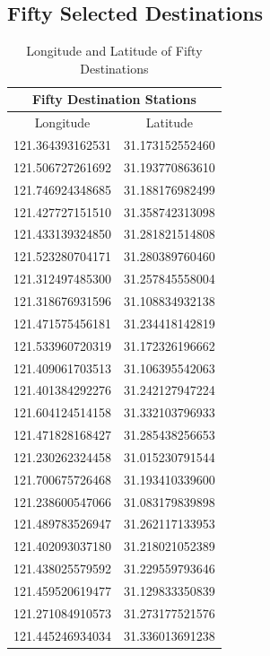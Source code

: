 \documentclass{mcmthesis}
\begin{document}
\newpage
\begin{appendices}
\section{Fifty Selected Destinations}
\begin{table}[htbp]
  \centering
  \caption{Longitude and Latitude of Fifty Destinations}
  \renewcommand\arraystretch{1.35}
    \begin{tabular}{|c|c|}
    \multicolumn{2}{c}{Fifty Destination Stations} \\
    \hline
    Longitude & Latitude \\
    \hline
    121.364393162531  & 31.173152552460  \\
    121.506727261692  & 31.193770863610  \\
    121.746924348685  & 31.188176982499  \\
    121.427727151510  & 31.358742313098  \\
    121.433139324850  & 31.281821514808  \\
    121.523280704171  & 31.280389760460  \\
    121.312497485300  & 31.257845558004  \\
    121.318676931596  & 31.108834932138  \\
    121.471575456181  & 31.234418142819  \\
    121.533960720319  & 31.172326196662  \\
    121.409061703513  & 31.106395542063  \\
    121.401384292276  & 31.242127947224  \\
    121.604124514158  & 31.332103796933  \\
    121.471828168427  & 31.285438256653  \\
    121.230262324458  & 31.015230791544  \\
    121.700675726468  & 31.193410339600  \\
    121.238600547066  & 31.083179839898  \\
    121.489783526947  & 31.262117133953  \\
    121.402093037180  & 31.218021052389  \\
    121.438025579592  & 31.229559793646  \\
    121.459520619477  & 31.129833350839  \\
    121.271084910573  & 31.273177521576  \\
    121.445246934034  & 31.336013691238  \\

\end{tabular}
\end{table}
\end{appendices}
\end{document}
